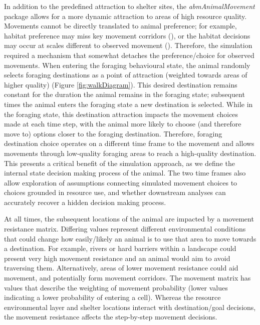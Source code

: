 \documentclass[10pt,a4paper]{article}
\begin{document}
In addition to the predefined attraction to shelter sites, the \emph{abmAnimalMovement} package allows for a more dynamic attraction to areas of high resource quality.
Movements cannot be directly translated to animal preference; for example, habitat preference may miss key movement corridors (), or the habitat decisions may occur at scales different to observed movement ().
Therefore, the simulation required a mechanism that somewhat detaches the preference/choice for observed movements.
When entering the foraging behavioural state, the animal randomly selects foraging destinations as a point of attraction (weighted towards areas of higher quality) (Figure \ref{fig:walkDiagram}).
This desired destination remains constant for the duration the animal remains in the foraging state; subsequent times the animal enters the foraging state a new destination is selected.
While in the foraging state, this destination attraction impacts the movement choices made at each time step, with the animal more likely to choose (and therefore move to) options closer to the foraging destination.
Therefore, foraging destination choice operates on a different time frame to the movement and allows movements through low-quality foraging areas to reach a high-quality destination.
This presents a critical benefit of the simulation approach, as we define the internal state decision making process of the animal.
The two time frames also allow exploration of assumptions connecting simulated movement choices to choices grounded in resource use, and whether downstream analyses can accurately recover a hidden decision making process.

At all times, the subsequent locations of the animal are impacted by a movement resistance matrix.
Differing values represent different environmental conditions that could change how easily/likely an animal is to use that area to move towards a destination.
For example, rivers or hard barriers within a landscape could present very high movement resistance and an animal would aim to avoid traversing them.
Alternatively, areas of lower movement resistance could aid movement, and potentially form movement corridors.
The movement matrix has values that describe the weighting of movement probability (lower values indicating a lower probability of entering a cell).
Whereas the resource environmental layer and shelter locations interact with destination/goal decisions, the movement resistance affects the step-by-step movement decisions.
\end{document}

